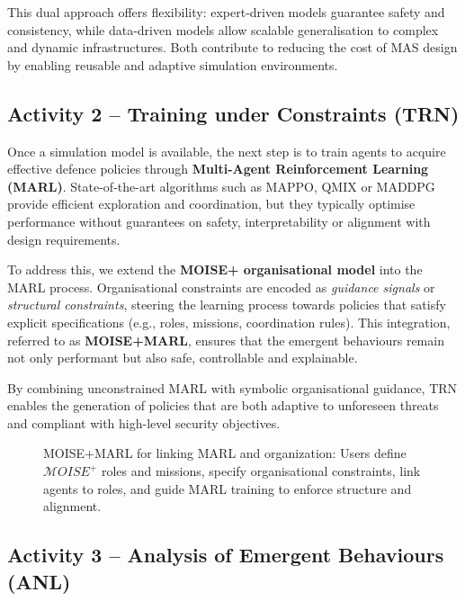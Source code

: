\documentclass[a4paper,10pt,twocolumn]{article}
\begin{document}
This dual approach offers flexibility: expert-driven models guarantee
safety and consistency, while data-driven models allow scalable
generalisation to complex and dynamic infrastructures. Both contribute
to reducing the cost of MAS design by enabling reusable and adaptive
simulation environments.



\subsection*{Activity 2 – Training under Constraints (TRN)}

Once a simulation model is available, the next step is to train agents
to acquire effective defence policies through
\textbf{Multi-Agent Reinforcement Learning (MARL)}.
State-of-the-art algorithms such as MAPPO, QMIX or MADDPG provide
efficient exploration and coordination, but they typically optimise
performance without guarantees on safety, interpretability or alignment
with design requirements.

To address this, we extend the \textbf{MOISE+ organisational model} into
the MARL process. Organisational constraints are encoded as
\emph{guidance signals} or \emph{structural constraints}, steering the
learning process towards policies that satisfy explicit specifications
(e.g., roles, missions, coordination rules). This integration,
referred to as \textbf{MOISE+MARL}, ensures that the emergent behaviours
remain not only performant but also safe, controllable and explainable.

By combining unconstrained MARL with symbolic organisational guidance,
TRN enables the generation of policies that are both adaptive to
unforeseen threats and compliant with high-level security objectives.

\begin{figure}[h!]
    \centering
    \resizebox{0.5\textwidth}{!}{%
        
    }
    \caption{MOISE+MARL for linking MARL and organization: Users define $\mathcal{M}OISE^+$ roles and missions, specify organisational constraints, link agents to roles, and guide MARL training to enforce structure and alignment.}
    \label{fig:mm_synthesis}
\end{figure}



\subsection*{Activity 3 – Analysis of Emergent Behaviours (ANL)}
\end{document}
